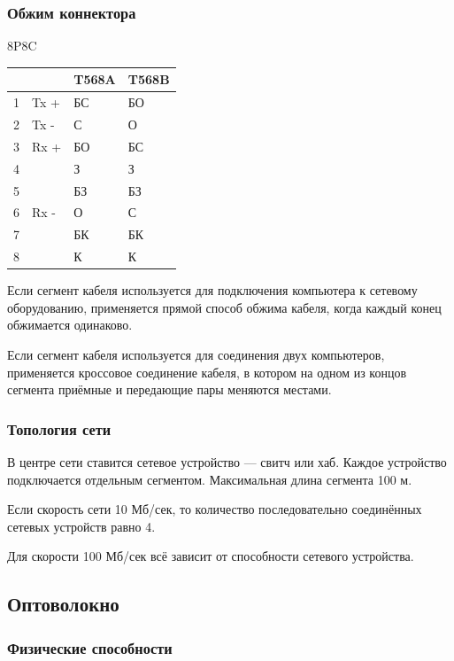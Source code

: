 \documentclass[12pt, russian, oneside, article]{ncc}
\begin{document}
\subsubsection{Обжим коннектора}
\label{sec-4_5_2}


8P8C

\begin{center}
\begin{tabular}{rlll}
    &        &  T568A  &  T568B  \\
\hline
 1  &  Tx +  &  БС     &  БО     \\
 2  &  Tx -  &  С      &  О      \\
 3  &  Rx +  &  БО     &  БС     \\
 4  &        &  З      &  З      \\
 5  &        &  БЗ     &  БЗ     \\
 6  &  Rx -  &  О      &  С      \\
 7  &        &  БК     &  БК     \\
 8  &        &  К      &  К      \\
\end{tabular}
\end{center}



Если сегмент кабеля используется для подключения компьютера к сетевому оборудованию, применяется прямой способ обжима кабеля, когда каждый конец обжимается одинаково.

Если сегмент кабеля используется для соединения двух компьютеров, применяется кроссовое соединение кабеля, в котором на одном из концов сегмента приёмные и передающие пары меняются местами.
\subsubsection{Топология сети}
\label{sec-4_5_3}


В центре сети ставится сетевое устройство --- свитч или хаб. Каждое устройство подключается отдельным сегментом. Максимальная длина сегмента 100 м.

Если скорость сети 10 Мб/сек, то количество последовательно соединённых сетевых устройств равно 4.

Для скорости 100 Мб/сек всё зависит от способности сетевого устройства.
\subsection{Оптоволокно}
\label{sec-4_6}
\subsubsection{Физические способности}
\label{sec-4_6_1}
\end{document}
